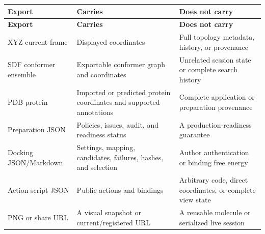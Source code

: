 \documentclass[11pt]{article}
\begin{document}

\begingroup
\footnotesize
\begin{longtable}{@{}p{1.20in}p{2.48in}p{2.92in}@{}}
\toprule
\textbf{Export} & \textbf{Carries} & \textbf{Does not carry}\\
\midrule
\endfirsthead
\toprule
\textbf{Export} & \textbf{Carries} & \textbf{Does not carry}\\
\midrule
\endhead
XYZ current frame & Displayed coordinates & Full topology metadata, history, or provenance\\
SDF conformer ensemble & Exportable conformer graph and coordinates & Unrelated session state or complete search history\\
PDB protein & Imported or predicted protein coordinates and supported annotations & Complete application or preparation provenance\\
Preparation JSON & Policies, issues, audit, and readiness status & A production-readiness guarantee\\
Docking JSON/Markdown & Settings, mapping, candidates, failures, hashes, and selection & Author authentication or binding free energy\\
Action script JSON & Public actions and bindings & Arbitrary code, direct coordinates, or complete view state\\
PNG or share URL & A visual snapshot or current/registered URL & A reusable molecule or serialized live session\\
\bottomrule
\end{longtable}
\endgroup
\end{document}
